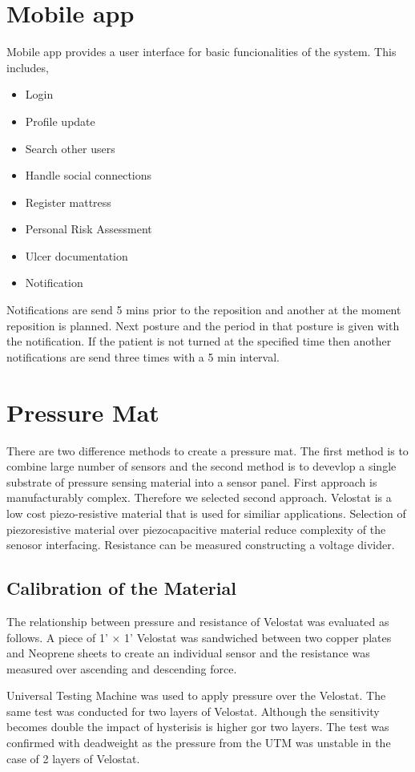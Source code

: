\section{Mobile app} 

Mobile app provides a user interface for basic funcionalities of the system. This includes,
\begin{itemize}
	\item Login
	\item Profile update
	\item Search other users
	\item Handle social connections
	\item Register mattress
	\item Personal Risk Assessment
	\item Ulcer documentation
	\item Notification
\end{itemize}

Notifications are  send 5  mins prior to the reposition and another at the moment reposition is planned. Next posture and the period in that posture is given with the notification. If the patient is not turned at the specified time then another notifications are send three times with a 5 min interval.




\section{Pressure Mat}

There are two difference methods to create a pressure mat. The first method is to combine large number of sensors and the second method is to devevlop a single substrate of pressure sensing material into a sensor panel. First approach is manufacturably complex. Therefore we selected second approach. Velostat\textsuperscript{\textregistered} is a low cost piezo-resistive material that is used for similiar applications. Selection of piezoresistive material over piezocapacitive material reduce complexity of the senosor interfacing. Resistance can be measured constructing a voltage divider. 


\subsection{Calibration of the Material}

The relationship between pressure and resistance of Velostat was evaluated as follows. A piece of 1' $\times$ 1' Velostat was sandwiched between two copper plates and Neoprene sheets to create an individual sensor and the resistance was measured over ascending and descending force. 

 Universal Testing Machine was used to apply pressure over the Velostat. The same test was conducted for two layers of Velostat. Although the sensitivity becomes double the impact of hysterisis is higher gor two layers. The test was confirmed with deadweight as the pressure from the UTM was unstable in the case of 2 layers of Velostat.

